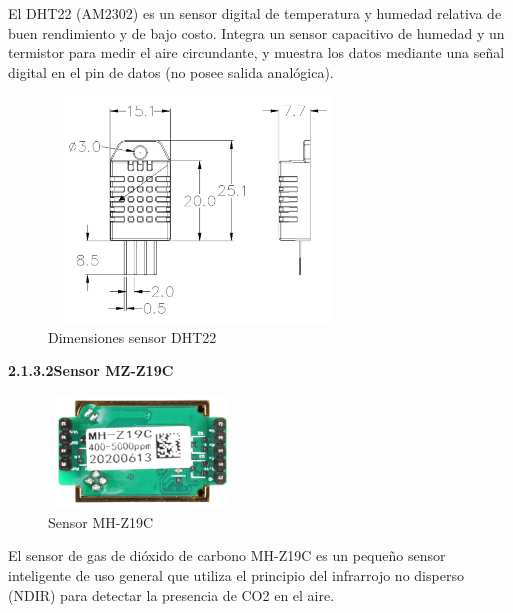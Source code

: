 El DHT22 (AM2302) es un sensor digital de temperatura y humedad relativa de buen rendimiento y de bajo costo. Integra un sensor capacitivo de humedad y un termistor para medir el aire circundante, y muestra los datos mediante una señal digital en el pin de datos (no posee salida analógica).\\

\begin{figure}[H]
    \centering
    \includegraphics[width=8cm, height=6cm]{imagenes/dht22 dimensiones.jpg}
    \caption{Dimensiones sensor DHT22}
    \label{imag:dimensiones_dht22}
\end{figure}

\vspace{1cm}

        \textbf{2.1.3.2\hspace{5mm}Sensor MZ-Z19C}

\begin{figure}[H]
      \centering
      \includegraphics[width=5cm, height=3cm]{imagenes/mh-z19c.png}
      \caption{Sensor MH-Z19C}
      \label{imag:mh-z19c}
   \end{figure}

El sensor de gas de dióxido de carbono MH-Z19C es un pequeño sensor inteligente de uso general que utiliza el principio del infrarrojo no disperso (NDIR) para detectar la presencia de CO2 en el aire.\\

